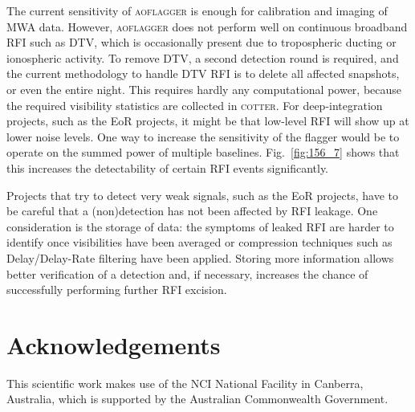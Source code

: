 \documentclass{pasa}
\begin{document}
The current sensitivity of \textsc{aoflagger} is enough for calibration and imaging of MWA data. However, \textsc{aoflagger} does not perform well on continuous broadband RFI such as DTV, which is occasionally present due to tropospheric ducting or ionospheric activity. To remove DTV, a second detection round is required, and the current methodology to handle DTV RFI is to delete all affected snapshots, or even the entire night. This requires hardly any computational power, because the required visibility statistics are collected in \textsc{cotter}. For deep-integration projects, such as the EoR projects, it might be that low-level RFI will show up at lower noise levels. One way to increase the sensitivity of the flagger would be to operate on the summed power of multiple baselines. Fig.~\ref{fig:156_7} shows that this increases the detectability of certain RFI events significantly.

Projects that try to detect very weak signals, such as the EoR projects, have to be careful that a (non)detection has not been affected by RFI leakage. One consideration is the storage of data: the symptoms of leaked RFI are harder to identify once visibilities have been averaged or compression techniques such as Delay/Delay-Rate filtering \citep{parsons-paper-eorlimit-2014} have been applied. Storing more information allows better verification of a detection and, if necessary, increases the chance of successfully performing further RFI excision.

\section*{Acknowledgements}
This scientific work makes use of the NCI National Facility in Canberra, Australia, which is supported by the Australian Commonwealth Government.
\end{document}
